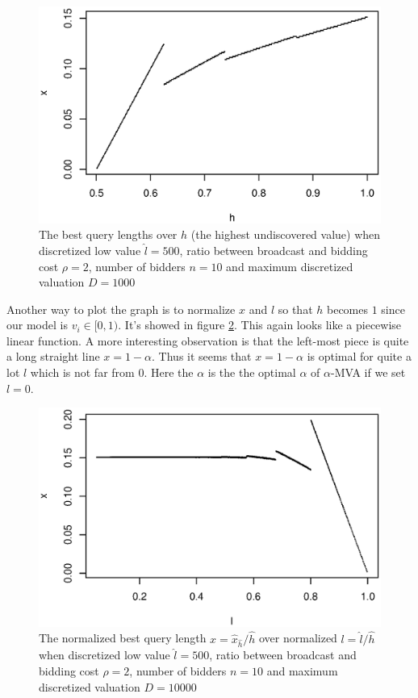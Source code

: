 \begin{figure}
\centering
    \includegraphics[trim=0mm 5mm 5mm 15mm, clip, width=\linewidth]{figures/1000-500-2-1-10}
    \caption{The best query lengths over $h$ (the highest
        undiscovered value) when discretized low value $\hat l = 500$,
        ratio between broadcast and bidding cost $\rho = 2$,
        number of bidders $n = 10$ and maximum discretized valuation
        $D = 1000$}\label{fig:x-h}
\end{figure}

Another way to plot the graph is to normalize $x$ and $l$ so that $h$ becomes
$1$ since our model is $v_i \in [0, 1)$. It's showed in figure \ref{fig:x-l}.
This again looks like a piecewise linear function.  A more interesting
observation is that the left-most piece is quite a long straight line $x =
1-\alpha$. Thus it seems that $x = 1-\alpha$ is optimal for quite a lot $l$ which is not
far from $0$. Here the $\alpha$ is the the optimal $\alpha$ of $\alpha$-MVA if
we set $l = 0$.

\begin{figure}
\centering
    \includegraphics[trim=0mm 5mm 5mm 15mm, clip, width=\linewidth]{figures/10000-500-2-1-10}
    \caption{The normalized best query length $x = \hat x_{\hat h} / \hat h$
    over normalized $l = \hat l / \hat h$ when discretized low value $\hat l =
    500$, ratio between broadcast and bidding cost $\rho = 2$, number of
    bidders $n = 10$ and maximum discretized valuation $D =
    10000$}\label{fig:x-l}
\end{figure}

